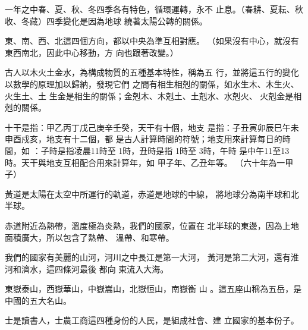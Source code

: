\documentclass[avery5371,grid]{flashcards}
\begin{document}
{一年之中春、夏、秋、冬四季各有特色，循環運轉，永不
止息。（春耕、夏耘、秋收、冬藏）四季變化是因為地球
繞著太陽公轉的關係。} %
{} %



{東、南、西、北這四個方向，都以中央為準互相對應。} %
{（如果沒有中心，就沒有東西南北，因此中心移動，方
向也跟著改變。）} %



{古人以木火土金水，為構成物質的五種基本特性，稱為五
行，並將這五行的變化以數學的原理加以歸納，發現它們
之間有相生相剋的關係，如水生木、木生火、火生土、土
生金是相生的關係；金剋木、木剋土、土剋水、水剋火、
火剋金是相剋的關係。} %
{} %


{十干是指：甲乙丙丁戊己庚辛壬癸，天干有十個，地支
是指：子丑寅卯辰巳午未申酉戍亥，地支有十二個，都
是古人計算時間的符號；地支用來計算每日的時間，如
：子時是指凌晨11時至 1時，丑時是指 1時至 3時，午時
是中午11至13時。天干與地支互相配合用來計算年，如
甲子年、乙丑年等。} %
{（六十年為一甲子）} %


{黃道是太陽在太空中所運行的軌道，赤道是地球的中線，
將地球分為南半球和北半球。} %
{} %


{赤道附近為熱帶，溫度極為炎熱，我們的國家，位置在
北半球的東邊，因為上地面積廣大，所以包含了熱帶、
溫帶、和寒帶。} %
{} %


{我們的國家有美麗的山河，河川之中長江是第一大河，
黃河是第二大河，還有淮河和濟水，這四條河最後 都向
東流入大海。} %
{} %


{東嶽泰山，西嶽華山，中嶽嵩山，北嶽恒山，南嶽衡
山 。這五座山稱為五岳，是中國的五大名山。} %
{} %


{士是讀書人，士農工商這四種身份的人民，是組成社會、建
立國家的基本份子。} %
{} %
\end{document}
